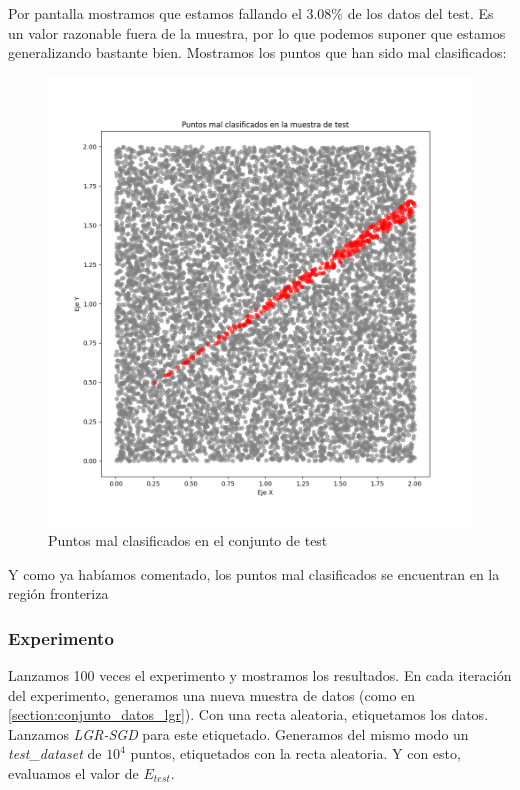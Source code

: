 \documentclass[11pt]{article}
\begin{document}
Por pantalla mostramos que estamos fallando el $3.08\%$ de los datos del test. Es un valor razonable fuera de la muestra, por lo que podemos suponer que estamos generalizando bastante bien. Mostramos los puntos que han sido mal clasificados:

\begin{figure}[H]
    \centering
    \includegraphics[scale=0.35]{lgr_puntos_mal_clasificados_test}
    \caption{Puntos mal clasificados en el conjunto de test}
\end{figure}

Y como ya habíamos comentado, los puntos mal clasificados se encuentran en la región fronteriza

\subsubsection{Experimento}

Lanzamos 100 veces el experimento y mostramos los resultados. En cada iteración del experimento, generamos una nueva muestra de datos (como en \ref{section:conjunto_datos_lgr}). Con una recta aleatoria, etiquetamos los datos. Lanzamos \emph{LGR-SGD} para este etiquetado. Generamos del mismo modo un \emph{test\_dataset} de $10^4$ puntos, etiquetados con la recta aleatoria. Y con esto, evaluamos el valor de $E_{test}$.
\end{document}
